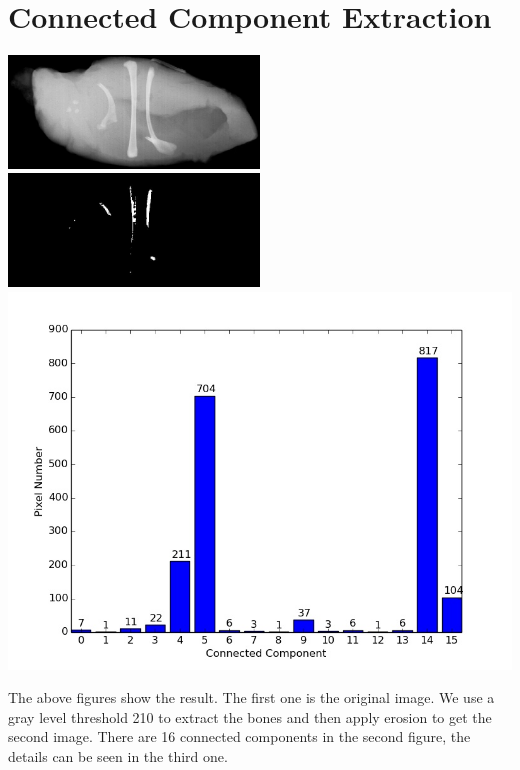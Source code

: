 \documentclass{article}
\begin{document}
\section{Connected Component Extraction}
\includegraphics[width=0.5\textwidth]{../data/chickenfilet_with_bones.jpg}
\includegraphics[width=0.5\textwidth]{../data/connected_component_extraction_chickenfilet_with_bones.jpg}
\includegraphics[width=\textwidth]{../data/connected_component_chickenfilet_with_bones.jpg}

The above figures show the result. The first one is the original image. We use a gray level threshold 210 to extract the bones and then apply erosion to get the second image. There are 16 connected components in the second figure, the details can be seen in the third one.
\end{document}
